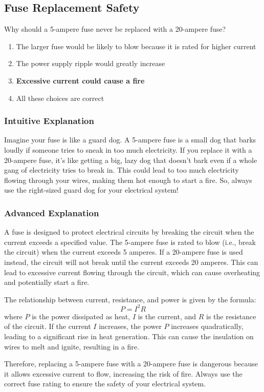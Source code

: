 \subsection{Fuse Replacement Safety}
\label{T0A05}

\begin{tcolorbox}[colback=gray!10!white,colframe=black!75!black,title=T0A05]
Why should a 5-ampere fuse never be replaced with a 20-ampere fuse?
\begin{enumerate}[label=\Alph*]
    \item The larger fuse would be likely to blow because it is rated for higher current
    \item The power supply ripple would greatly increase
    \item \textbf{Excessive current could cause a fire}
    \item All these choices are correct
\end{enumerate}
\end{tcolorbox}

\subsubsection{Intuitive Explanation}
Imagine your fuse is like a guard dog. A 5-ampere fuse is a small dog that barks loudly if someone tries to sneak in too much electricity. If you replace it with a 20-ampere fuse, it's like getting a big, lazy dog that doesn't bark even if a whole gang of electricity tries to break in. This could lead to too much electricity flowing through your wires, making them hot enough to start a fire. So, always use the right-sized guard dog for your electrical system!

\subsubsection{Advanced Explanation}
A fuse is designed to protect electrical circuits by breaking the circuit when the current exceeds a specified value. The 5-ampere fuse is rated to blow (i.e., break the circuit) when the current exceeds 5 amperes. If a 20-ampere fuse is used instead, the circuit will not break until the current exceeds 20 amperes. This can lead to excessive current flowing through the circuit, which can cause overheating and potentially start a fire.

The relationship between current, resistance, and power is given by the formula:
\[ P = I^2 R \]
where \( P \) is the power dissipated as heat, \( I \) is the current, and \( R \) is the resistance of the circuit. If the current \( I \) increases, the power \( P \) increases quadratically, leading to a significant rise in heat generation. This can cause the insulation on wires to melt and ignite, resulting in a fire.

Therefore, replacing a 5-ampere fuse with a 20-ampere fuse is dangerous because it allows excessive current to flow, increasing the risk of fire. Always use the correct fuse rating to ensure the safety of your electrical system.

